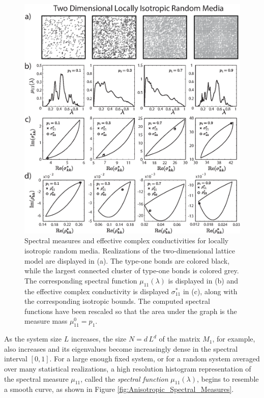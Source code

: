 \documentclass{cmslatex}
\begin{document}
%
\begin{figure}[t]
  \centerline{\includegraphics[scale=0.75]{A_Locally_Isotropic_RRN_11.eps}}
\caption{Spectral measures and effective complex conductivities for
  locally isotropic random media. Realizations of the two-dimensional
  lattice model are displayed in (a). The type-one bonds are colored
  black, while the largest connected cluster of type-one bonds is
  colored grey. The corresponding spectral function $\mu_{11}(\lambda)$ is
  displayed in (b) and the effective complex conductivity is displayed
  $\sigma^*_{11}$ in (c), along with the corresponding isotropic
  bounds. The computed spectral functions have been rescaled so that
  the area under the graph is the measure mass $\mu^0_{11}=p_1$.  
        } 
\label{fig:LocIsotropic_RRN_11}
\end{figure}
%


As the system size $L$ increases, the size $N=d\,L^d$ of the matrix
$M_1$, for example, also increases and its eigenvalues become
increasingly dense in the spectral interval $[0,1]$. For a large
enough fixed system, or for a random system averaged over many
statistical realizations, a high resolution histogram representation
of the spectral measure $\mu_{11}$, called the \emph{spectral function}
$\mu_{11}(\lambda)$, begins to resemble a smooth curve, as shown in Figure
\ref{fig:Anisotropic_Spectral_Measures}.
\end{document}
